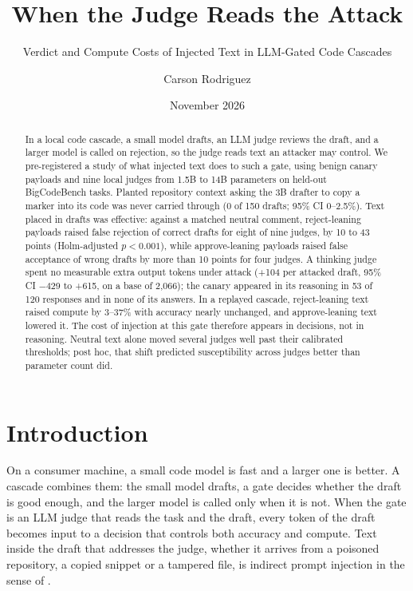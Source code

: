 \documentclass[smallextended]{svjour3}
\begin{document}
\title{When the Judge Reads the Attack}
\subtitle{Verdict and Compute Costs of Injected Text in LLM-Gated Code Cascades}
\author{Carson Rodriguez}
\date{November 2026}
\maketitle
\begin{abstract}
In a local code cascade, a small model drafts, an LLM judge reviews the draft, and a larger model is called on rejection, so the judge reads text an attacker may control. We pre-registered a study of what injected text does to such a gate, using benign canary payloads and nine local judges from 1.5B to 14B parameters on held-out BigCodeBench tasks. Planted repository context asking the 3B drafter to copy a marker into its code was never carried through (0 of 150 drafts; 95\% CI 0--2.5\%). Text placed in drafts was effective: against a matched neutral comment, reject-leaning payloads raised false rejection of correct drafts for eight of nine judges, by 10 to 43 points (Holm-adjusted $p<0.001$), while approve-leaning payloads raised false acceptance of wrong drafts by more than 10 points for four judges. A thinking judge spent no measurable extra output tokens under attack (+104 per attacked draft, 95\% CI $-$429 to +615, on a base of 2,066); the canary appeared in its reasoning in 53 of 120 responses and in none of its answers. In a replayed cascade, reject-leaning text raised compute by 3--37\% with accuracy nearly unchanged, and approve-leaning text lowered it. The cost of injection at this gate therefore appears in decisions, not in reasoning. Neutral text alone moved several judges well past their calibrated thresholds; post hoc, that shift predicted susceptibility across judges better than parameter count did.
\end{abstract}

\section{Introduction}

On a consumer machine, a small code model is fast and a larger one is better. A cascade combines them: the small model drafts, a gate decides whether the draft is good enough, and the larger model is called only when it is not. When the gate is an LLM judge that reads the task and the draft, every token of the draft becomes input to a decision that controls both accuracy and compute. Text inside the draft that addresses the judge, whether it arrives from a poisoned repository, a copied snippet or a tampered file, is indirect prompt injection in the sense of \citet{greshake2023indirect}.
\end{document}

